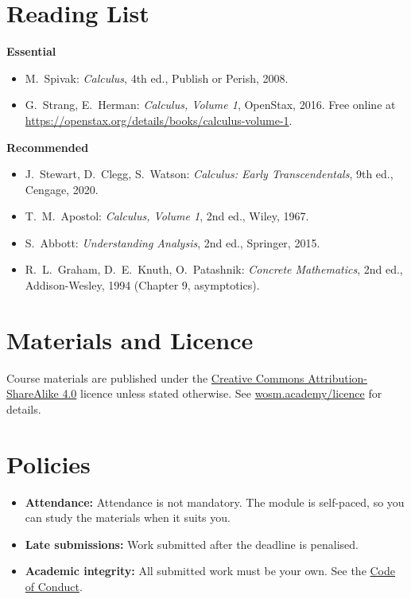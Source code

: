 \documentclass[11pt,a4paper]{article}
\begin{document}
\section{Reading List}
\textbf{Essential}
\begin{itemize}
  \item M.\ Spivak: \textit{Calculus}, 4th ed., Publish or Perish, 2008.
  \item G.\ Strang, E.\ Herman: \textit{Calculus, Volume 1}, OpenStax, 2016. Free online at \url{https://openstax.org/details/books/calculus-volume-1}.
\end{itemize}
\textbf{Recommended}
\begin{itemize}
  \item J.\ Stewart, D.\ Clegg, S.\ Watson: \textit{Calculus: Early Transcendentals}, 9th ed., Cengage, 2020.
  \item T.\ M.\ Apostol: \textit{Calculus, Volume 1}, 2nd ed., Wiley, 1967.
  \item S.\ Abbott: \textit{Understanding Analysis}, 2nd ed., Springer, 2015.
  \item R.\ L.\ Graham, D.\ E.\ Knuth, O.\ Patashnik: \textit{Concrete Mathematics}, 2nd ed., Addison-Wesley, 1994 (Chapter 9, asymptotics).
\end{itemize}

\section{Materials and Licence}
Course materials are published under the
\href{https://creativecommons.org/licenses/by-sa/4.0/}{Creative Commons Attribution-ShareAlike 4.0}
licence unless stated otherwise. See \href{https://wosm.academy/licence/}{wosm.academy/licence} for details.

\section{Policies}
\begin{itemize}
  \item \textbf{Attendance:} Attendance is not mandatory. The module is self-paced, so you can study the materials when it suits you.
  \item \textbf{Late submissions:} Work submitted after the deadline is penalised.
  \item \textbf{Academic integrity:} All submitted work must be your own.
        See the \href{https://wosm.academy/code-of-conduct/}{Code of Conduct}.
\end{itemize}
\end{document}
